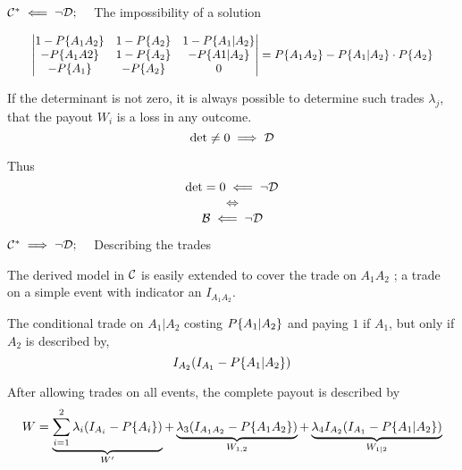 \begin{frame}{$\mathcal{C}^*\impliedby\neg\mathcal{D};\quad$ The impossibility of a solution}
\begin{minipage}{\linewidth}
$$
\resizebox{0.95\hsize}{!}{
$
\begin{vmatrix}
1-\pr{A_1A_2}&1-\pr{A_2}&1-\pr{A_1|A_2}\\
-\pr{A_1A2}&1-\pr{A_2}&-\pr{A1|A_2}\\
-\pr{A_1}&-\pr{A_2}&0\\
\end{vmatrix}
=
\pr{A_1A_2}-\pr{A_1|A_2}\cdot\pr{A_2}
$
}
$$
\end{minipage}
\vfill
\begin{minipage}{\linewidth}
\begin{minipage}{0.47\linewidth}
If the determinant is not zero, it is always possible to determine such trades ${\lambda_j}$, that the payout $W_i$ is a loss in any outcome.
$$\det\ne0\implies\mathcal{D}$$
\end{minipage}
\hfill
\begin{minipage}{0.45\linewidth}
\centerline{}

Thus
\begingroup
\setlength{\abovedisplayskip}{2pt}
\setlength{\belowdisplayskip}{2pt}
$$\det=0\impliedby\neg\mathcal{D}$$
$$\iff$$
$$\mathcal{B}\impliedby\neg\mathcal{D}$$
\endgroup
\end{minipage}
\end{minipage}
\end{frame}

\begin{frame}{$\mathcal{C}^*\implies\neg\mathcal{D};\quad$ Describing the trades}
\begin{minipage}{\linewidth}
\begin{minipage}{0.45\linewidth}
\begingroup
\setlength{\abovedisplayskip}{3pt}
\setlength{\belowdisplayskip}{3pt}
The derived model in $\mathcal{C}$ is easily extended to cover the trade on $A_1A_2$ ; a trade on a simple event with indicator an $I_{A_1A_2}$. 

\phantom{.}
\endgroup
\end{minipage}
\hfill
\begin{minipage}{0.45\linewidth}
The conditional trade on $A_1|A_2$ costing $P\{A_1|A_2\}$ and paying $1$ if $A_1$, but only if $A_2$ is described by,
$$I_{A_2}(I_{A_1}-P\{A_1|A_2\})$$
\end{minipage}
\end{minipage}
\vfill
\begin{minipage}{\linewidth}
After allowing trades on all events, the complete payout is described by
$$W=\underbrace{\sum_{i=1}^2\lambda_i(I_{A_i}-P\{A_i\})}_{W^\prime}+\underbrace{\lambda_3(I_{A_1A_2}-P\{A_1A_2\})}_{W_{1,2}}+\underbrace{\lambda_4I_{A_2}(I_{A_1}-P\{A_1|A_2\})}_{W_{1|2}}$$
\end{minipage}
\end{frame}

